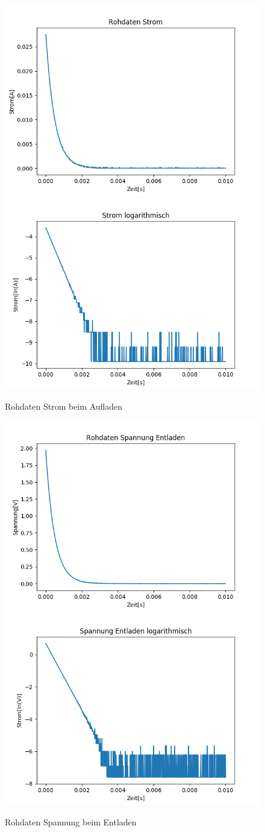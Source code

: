 \documentclass[12pt,a4paper]{article}
\begin{document}
\begin{figure}[H]
\begin{center}
\includegraphics[width=0.49\linewidth]{Bilder/Kondensator_I}
\includegraphics[width=0.49\linewidth]{Bilder/Kondensator_logI}
\caption[Rohdaten logarith. A]{Rohdaten Strom beim Aufladen}
\label{fig:RohU}
\end{center}
\end{figure}

\begin{figure}[H]
\begin{center}
\includegraphics[width=0.49\linewidth]{Bilder/Kondensator_ent_U}
\includegraphics[width=0.49\linewidth]{Bilder/Kondensator_ent_logU}
\caption[Rohdaten logarith. A]{Rohdaten Spannung beim Entladen}
\label{fig:RohU}
\end{center}
\end{figure}
\end{document}
